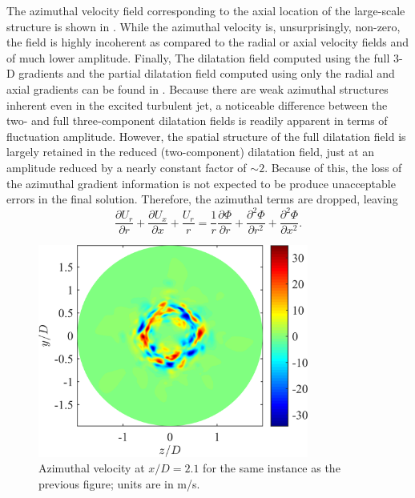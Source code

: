 The azimuthal velocity field corresponding to the axial location of the large-scale structure is shown in .
While the azimuthal velocity is, unsurprisingly, non-zero, the field is highly incoherent as compared to the radial or axial velocity fields and of much lower amplitude.
Finally, The dilatation field computed using the full 3-D gradients and the partial dilatation field computed using only the radial and axial gradients can be found in .
Because there are weak azimuthal structures inherent even in the excited turbulent jet, a noticeable difference between the two- and full three-component dilatation fields is readily apparent in terms of fluctuation amplitude.
However, the spatial structure of the full dilatation field is largely retained in the reduced (two-component) dilatation field, just at an amplitude reduced by a nearly constant factor of $\sim 2$.
Because of this, the loss of the azimuthal gradient information is not expected to be produce unacceptable errors in the final solution.
Therefore, the azimuthal terms are dropped, leaving
\begin{equation}
\frac{\partial U_r}{\partial r} + \frac{\partial U_x}{\partial x} + \frac{U_r}{r} = \frac{1}{r} \frac{\partial \Phi}{\partial r} + \frac{\partial^2 \Phi}{\partial r^2} + \frac{\partial^2 \Phi}{\partial x^2}.
\label{eq:helmholtz}
\end{equation}
\begin{figure}
	\centering
	\includegraphics[width = 3.5in]{Figures/LES_phavg_cross_velocity.png}
	\caption{Azimuthal velocity at $x/D = 2.1$ for the same instance as the previous figure; units are in m/s.}
	\label{fig:LES_cross_phavg}
\end{figure}
